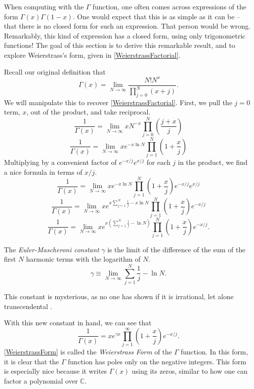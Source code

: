 When computing with the $\Gamma$ function, one often comes across expressions of the form $\Gamma(x)\Gamma(1-x)$.
One would expect that this is as simple as it can be -- that there is no closed form for such an expression.
That person would be wrong.
Remarkably, this kind of expression has a closed form, using only trigonometric functions!
The goal of this section is to derive this remarkable result, and to explore Weierstrass's form, given in \eqref{WeierstrassFactorial}.

Recall our original definition that 
$$\Gamma(x) = \lim_{N\rightarrow \infty} \frac{N! N^x}{\prod_{j=0}^N (x + j)}.$$
We will manipulate this to recover \eqref{WeierstrassFactorial}.
First, we pull the $j=0$ term, $x$, out of the product, and take reciprocal.
$$\frac{1}{\Gamma(x)} = \lim_{N \rightarrow \infty} x N^{-x} \prod_{j=0}^N \left( \frac{j+x}{j} \right)$$
$$\frac{1}{\Gamma(x)} = \lim_{N \rightarrow \infty} x e^{-x\ln N} \prod_{j=1}^N \left( 1 + \frac{x}{j} \right)$$
Multiplying by a convenient factor of $e^{-x/j} e^{x/j}$ for each $j$ in the product, we find a nice formula in terms of $x/j$.  
$$\frac{1}{\Gamma(x)} = \lim_{N \rightarrow \infty} xe^{-x\ln N} \prod_{j=1}^N \left( 1 + \frac{x}{j} \right) e^{-x/j} e^{x/j}$$
$$\frac{1}{\Gamma(x)} = \lim_{N \rightarrow \infty} xe^{x\sum_{j=1}^N \frac{1}{j} -x\ln N} \prod_{j=1}^N \left( 1 + \frac{x}{j} \right) e^{-x/j} $$
$$\frac{1}{\Gamma(x)} = \lim_{N \rightarrow \infty} xe^{x\left(\sum_{j=1}^N \frac{1}{j} -\ln N\right)} \prod_{j=1}^N \left( 1 + \frac{x}{j} \right) e^{-x/j}.$$

\begin{defn}
The \textit{Euler-Mascheroni constant} $\gamma$ is the limit of the difference of the sum of the first $N$ harmonic terms with the logarithm of $N$.
$$\gamma \equiv \lim_{N \rightarrow \infty} \sum_{j=1}^N \frac{1}{j} - \ln N.$$
\end{defn}
This constant is mysterious, as no one has shown if it is irrational, let alone transcendental \cite{EulerMascheroni}.  

With this new constant in hand, we can see that
\begin{equation}\label{WeierstrassForm}
\boxed{\frac{1}{\Gamma(x)} = xe^{\gamma x} \prod_{j=1}^\infty \left(1 + \frac{x}{j}\right)e^{-x/j}}.
\end{equation}
\eqref{WeierstrassForm} is called the \textit{Weierstrass Form} of the $\Gamma$ function. 
In this form, it is clear that the $\Gamma$ function has poles only on the negative integers.
This form is especially nice because it writes $\Gamma(x)$ using its zeros, similar to how one can factor a polynomial over $\mathbb{C}$.

